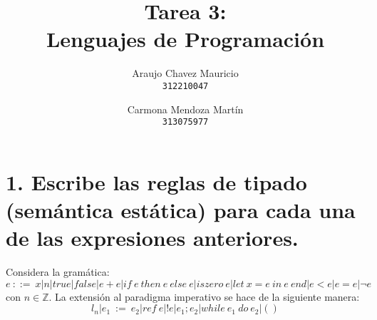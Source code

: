 \documentclass[11pt, a4paper]{report}
\begin{document}
\title{Tarea 3: \\Lenguajes de Programaci\'on}
\author{
  Araujo Chavez Mauricio\\
  \texttt{312210047}
  \and
  Carmona Mendoza Mart\'in\\
  \texttt{313075977}
}
\date{}
\maketitle

\section*{1. Escribe las reglas de tipado (semántica estática) para cada una de las expresiones anteriores.}
Considera la gramática:
$$ e\ ::=\ x|n|true|false|e+e|if\ e\ then\ e\ else\ e|iszero\ e|let\ x=e\ in\ e\ end|e<e|e=e|\neg e  $$ 
con $n\in \mathbb{Z}$. La extensión al paradigma imperativo se hace de la siguiente manera:
$$ l_{n}|e_{1}\ :=\ e_{2}|ref\ e|!e|e_{1};e_{2}|while\ e_{1}\ do\ e_{2}|() $$
\end{document}
